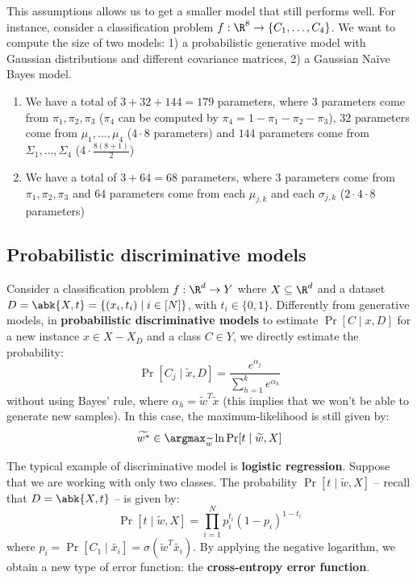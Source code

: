 \documentclass[a4paper, 12pt]{report}
\begin{document}
    This assumptions allows us to get a smaller model that still performs well. For instance, consider a classification problem $f : \R^8 \to \{C_1, \ldots, C_4\}$. We want to compute the size of two models: 1) a probabilistic generative model with Gaussian distributions and different covariance matrices, 2) a Gaussian Naïve Bayes model.
    \begin{enumerate}
        \item We have a total of $3+32+144 = 179$ parameters, where $3$ parameters come from $\pi_1, \pi_2, \pi_3$ ($\pi_4$ can be computed by $\pi_4 = 1 - \pi_1 - \pi_2 - \pi_3$), $32$ parameters come from $\mu_1, \ldots, \mu_4$ ($4 \cdot 8$ parameters) and $144$ parameters come from $\Sigma_1, \ldots, \Sigma_4$ ($4 \cdot \frac{8(8+1)}{2}$)
        \item We have a total of $3+64= 68$ parameters, where $3$ parameters come from $\pi_1, \pi_2, \pi_3$ and $64$ parameters come from each $\mu_{j,k}$ and each $\sigma_{j,k}$ ($2 \cdot 4 \cdot 8$ parameters)
    \end{enumerate}

    \subsection{Probabilistic discriminative models}

    Consider a classification problem $f : \R^d \to Y$ where $X \subseteq \R^d$ and a dataset $D = \abk{X,t} = \{(x_i,t_i) \mid i \in [N]\}$, with $t_i \in \{0,1\}$.
    Differently from generative models, in \textbf{probabilistic discriminative models} to estimate $\Pr[C \mid x, D]$ for a new instance $x \in X-X_D$ and a class $C \in Y$, we directly estimate the probability:
    \[\Pr[C_j \mid \widetilde{x}, D] = \frac{e^{\alpha_j}}{\sum_{h = 1}^k e^{\alpha_h}}\]
    without using Bayes' rule, where $\alpha_h = \widetilde{w}^T \widetilde{x}$ (this implies that we won't be able to generate new samples). In this case, the maximum-likelihood is still given by:
    \[\widetilde{w^*} \in \argmax_{\widetilde{w}} \ln \Pr[t \mid \widetilde{w}, X]\]

    The typical example of discriminative model is \textbf{logistic regression}. Suppose that we are working with only two classes. The probability $\Pr[t \mid \widetilde{w},X]$ -- recall that $D = \abk{X,t}$ -- is given by:
    \[\Pr[t \mid \widetilde{w}, X] = \prod_{i = 1}^N p_i^{t_i} (1-p_i)^{1-t_i}\]
    where $p_i = \Pr[C_1 \mid \widetilde{x_i}] = \sigma(\widetilde{w}^T \widetilde{x_i})$. By applying the negative logarithm, we obtain a new type of error function: the \textbf{cross-entropy error function}.
\end{document}
